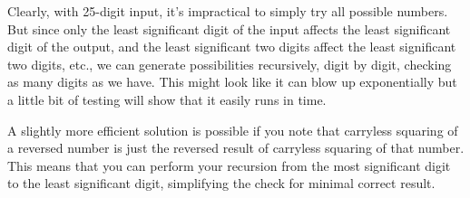 
\noindent
Clearly, with 25-digit input, it's impractical to simply try
all possible numbers.  But since only the least significant
digit of the input affects the least significant digit of the
output, and the least significant two digits affect the least
significant two digits, etc., we can generate possibilities
recursively, digit by digit, checking as many digits as we have.
This might look like it can blow up exponentially but a little
bit of testing will show that it easily runs in time.

A slightly more efficient solution is possible if you note that
carryless squaring of a reversed number is just the reversed
result of carryless squaring of that number.  This means that
you can perform your recursion from the most significant digit
to the least significant digit, simplifying the check for minimal
correct result.
